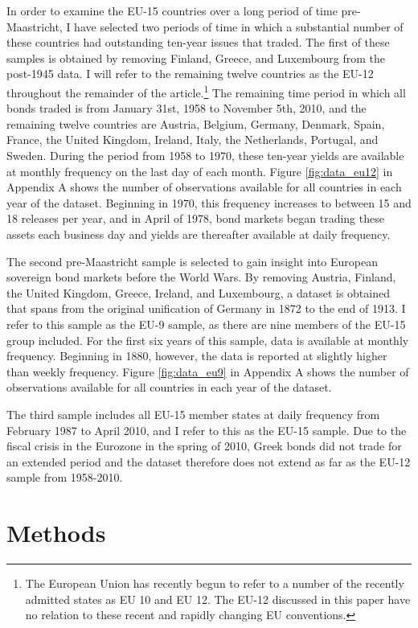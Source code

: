 \documentclass[3p]{elsarticle}
\begin{document}
In order to examine the EU-15 countries over a long period of time pre-Maastricht, I have selected two periods of time in which a substantial number of these countries had outstanding ten-year issues that traded.  The first of these samples is obtained by removing Finland, Greece, and Luxembourg from the post-1945 data.  I will refer to the remaining twelve countries as the EU-12 throughout the remainder of the article.\footnote{The European Union has recently begun to refer to a number of the recently admitted states as EU 10 and EU 12.  The EU-12 discussed in this paper have no relation to these recent and rapidly changing EU conventions.}  The remaining time period in which all bonds traded is from January 31st, 1958 to November 5th, 2010, and the remaining twelve countries are Austria, Belgium, Germany, Denmark, Spain, France, the United Kingdom, Ireland, Italy, the Netherlands, Portugal, and Sweden.  During the period from 1958 to 1970, these ten-year yields are available at monthly frequency on the last day of each month.  Figure \ref{fig:data_eu12} in Appendix A shows the number of observations available for all countries in each year of the dataset. Beginning in 1970, this frequency increases to between 15 and 18 releases per year, and in April of 1978, bond markets began trading these assets each business day and yields are thereafter available at daily frequency.

The second pre-Maastricht sample is selected to gain insight into European sovereign bond markets before the World Wars.  By removing Austria, Finland, the United Kingdom, Greece, Ireland, and Luxembourg, a dataset is obtained that spans from the original unification of Germany in 1872 to the end of 1913.  I refer to this sample as the EU-9 sample, as there are nine members of the EU-15 group included.  For the first six years of this sample, data is available at monthly frequency.  Beginning in 1880, however, the data is reported at slightly higher than weekly frequency.  Figure \ref{fig:data_eu9} in Appendix A shows the number of observations available for all countries in each year of the dataset.

The third sample includes all EU-15 member states at daily frequency from February 1987 to April 2010, and I refer to this as the EU-15 sample.  Due to the fiscal crisis in the Eurozone in the spring of 2010, Greek bonds did not trade for an extended period and the dataset therefore does not extend as far as the EU-12 sample from 1958-2010.

\section{Methods}
\label{sec:methods}
\end{document}
